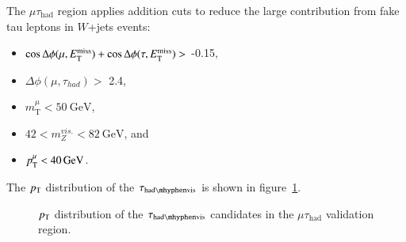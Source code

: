 The $\mu\tau_{\mathrm{had}}$ region applies addition cuts to reduce the large contribution from fake tau leptons in $W$+jets events:

\begin{itemize}
	\item $\cos{\Delta\phi(\mu, \ensuremath{E_{\text{T}}^{\text{miss}}})} + \cos{\Delta\phi(\tau, \ensuremath{E_{\text{T}}^{\text{miss}}})} >$ -0.15,
	\item $\Delta\phi(\mu, \tau_{had}) >$ 2.4,
	\item $m_{\mathrm{T}}^{\mu} < \SI{50}{\giga\electronvolt}$,
	\item $42< m_{Z}^{vis.} < \SI{82}{\giga\electronvolt}$, and
	\item $p_{\text{T}}^{\mu} < \SI{40}{\giga\electronvolt}$.
\end{itemize}

%
The $p_{\text{T}}$ distribution of the $\tauhadvis$ is shown in figure~\ref{fig:model-independent-VR-mutau}.
\begin{figure}[htbp]
  \centering
  \caption{$p_{\text{T}}$ distribution of the $\tauhadvis$ candidates in the $\mu\tau_{\mathrm{had}}$ validation region.}
  \label{fig:model-independent-VR-mutau}
\end{figure}


